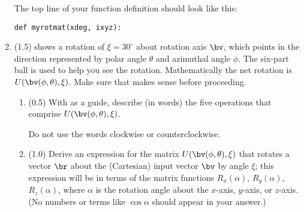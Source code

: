 \documentclass[11pt,titlepage,fleqn]{article}
\newcommand{\rotangA}{\alpha}
\newcommand{\rotangB}{\xi}    %
\newcommand{\rotvec}{\bv}      %
\newcommand{\Rmat}{R}
\newcommand{\Umat}{U}
\begin{document}
\begin{enumerate}
The top line of your function definition should look like this:
%
\begin{verbatim}
def myrotmat(xdeg, ixyz):
\end{verbatim}

\item (1.5)  shows a rotation of $\rotangB = 30^\circ$ about rotation axis $\rotvec$, which points in the direction represented by polar angle $\theta$ and azimuthal angle $\phi$. The six-part ball is used to help you see the rotation. Mathematically the net rotation is $\Umat(\rotvec(\phi,\theta),\rotangB)$. Make sure that  makes sense before proceeding.
%
\begin{enumerate}
\item (0.5) With  as a guide, describe (in words) the five operations that comprise $\Umat(\rotvec(\phi,\theta),\rotangB)$.

Do not use the words clockwise or counterclockwise.

\item (1.0) Derive an expression for the matrix $\Umat(\rotvec(\phi,\theta),\rotangB)$ that rotates a vector $\br$ about the (Cartesian) input vector $\rotvec$ by angle $\rotangB$; this expression will be in terms of the matrix functions $\Rmat_x(\rotangA)$, $\Rmat_y(\rotangA)$, $\Rmat_z(\rotangA)$, where $\rotangA$ is the rotation angle about the $x$-axis, $y$-axis, or $z$-axis. (No numbers or terms like $\cos\rotangA$ should appear in your answer.)

\end{enumerate}


\end{enumerate}
\end{document}
